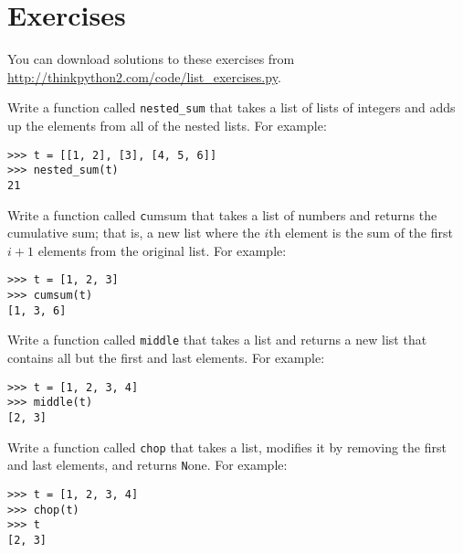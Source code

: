 \documentclass[
DIV=11,
fontsize=13,
twoside,
headinclude=false,
titlepage=firstiscover,
abstract=true,
headsepline=true,
footsepline=true,
chapterprefix=true, %
headings=big,
bibliography=totoc,%
captions=tableheading
]{scrbook}
\theoremstyle{definition}
\begin{document}
\section{Exercises}

You can download solutions to these exercises from
\url{http://thinkpython2.com/code/list_exercises.py}.

\begin{exercise}
\normalfont

Write a function called \verb"nested_sum" that takes a list of lists
of integers and adds up the elements from all of the nested lists.
For example:

\begin{lstlisting}
>>> t = [[1, 2], [3], [4, 5, 6]]
>>> nested_sum(t)
21
\end{lstlisting}

\end{exercise}

\begin{exercise}
\normalfont
\label{cumulative}

Write a function called {\texttt cumsum} that takes a list of numbers and
returns the cumulative sum; that is, a new list where the $i$th
element is the sum of the first $i+1$ elements from the original list.
For example:

\begin{lstlisting}
>>> t = [1, 2, 3]
>>> cumsum(t)
[1, 3, 6]
\end{lstlisting}

\end{exercise}

\begin{exercise}
\normalfont

Write a function called \verb"middle" that takes a list and
returns a new list that contains all but the first and last
elements.  For example:

\begin{lstlisting}
>>> t = [1, 2, 3, 4]
>>> middle(t)
[2, 3]
\end{lstlisting}

\end{exercise}

\begin{exercise}
\normalfont

Write a function called \verb"chop" that takes a list, modifies it
by removing the first and last elements, and returns {\texttt None}.
For example:

\begin{lstlisting}
>>> t = [1, 2, 3, 4]
>>> chop(t)
>>> t
[2, 3]
\end{lstlisting}

\end{exercise}
\end{document}
